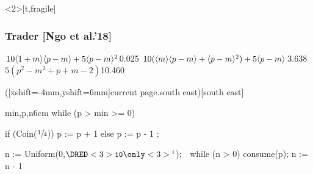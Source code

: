 \documentclass[
11pt,
usepdftitle=false,
aspectratio=169,
xcolor={table,usenames,dvipsnames},
]{beamer}
\begin{document}
\begin{frame}<2>[t,fragile]
  \frametitle{Trader [Ngo et al.'18]}

  {$10 \langle 1+m \rangle\langle p-m \rangle + 5 \langle p - m \rangle^2$}{0.025}
  {$10 (\langle m \rangle\langle p-m \rangle +\langle p - m \rangle^2) + 5 \langle p-m \rangle$}{3.638}
  {$5(p^2 - m^2 + p + m - 2)$}{10.460}

  \vspace{-10mm}
  \begin{overlayarea}{6.5cm}{4cm}
    \vfill
  \end{overlayarea}

  \begin{floating}([xshift=-4mm,yshift=6mm]current page.south east)[south east]
 \begin{codebox}{min,p,n}{6cm}
 while (p > min >= 0) {
   if (Coin($\sfrac{1}{4}$)) {
     p := p + 1
   } else { p := p - 1 };

   n := Uniform(0,$\DRED<3>{\text{\basicstyle{10}}\only<3>{{}^i}}$); $\phantom{{}^i}$
   while (n > 0) {
     consume(p); n := n - 1
   }
 }
\end{codebox}
  \end{floating}
  \end{frame}
\end{document}
